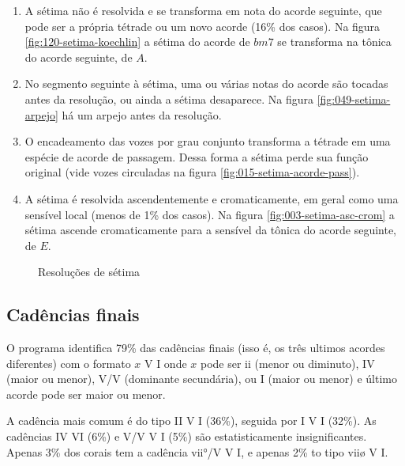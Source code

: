 \begin{enumerate}
\item A sétima não é resolvida e se transforma em nota do acorde
  seguinte, que pode ser a própria tétrade ou um novo acorde (16\% dos
  casos). Na figura \ref{fig:120-setima-koechlin} a sétima do acorde
  de $bm7$ se transforma na tônica do acorde seguinte, de $A$.
\item No segmento seguinte à sétima, uma ou várias notas do acorde são
  tocadas antes da resolução, ou ainda a sétima desaparece. Na figura
  \ref{fig:049-setima-arpejo} há um arpejo antes da resolução.
\item O encadeamento das vozes por grau conjunto transforma a tétrade
  em uma espécie de acorde de passagem. Dessa forma a sétima perde sua
  função original (vide vozes circuladas na figura
  \ref{fig:015-setima-acorde-pass}).
\item A sétima é resolvida ascendentemente e cromaticamente, em geral
  como uma sensível local (menos de 1\% dos casos). Na figura
  \ref{fig:003-setima-asc-crom} a sétima ascende cromaticamente para a
  sensível da tônica do acorde seguinte, de $E$.
\end{enumerate}

\begin{figure}
  \centering
  \caption{Resoluções de sétima}
  \label{fig:setima-resol}
\end{figure}

\subsection{Cadências finais}
\label{sec:cadencias}

O programa identifica 79\% das cadências finais (isso é, os três
ultimos acordes diferentes) com o formato $x$ V I onde $x$ pode ser ii
(menor ou diminuto), IV (maior ou menor), V/V (dominante secundária),
ou I (maior ou menor) e último acorde pode ser maior ou menor.

A cadência mais comum é do tipo II V I (36\%), seguida por I V I
(32\%). As cadências IV VI (6\%) e V/V V I (5\%) são estatisticamente
insignificantes. Apenas 3\% dos corais tem a cadência vii°/V V I, e
apenas 2\% to tipo viiø V I.

